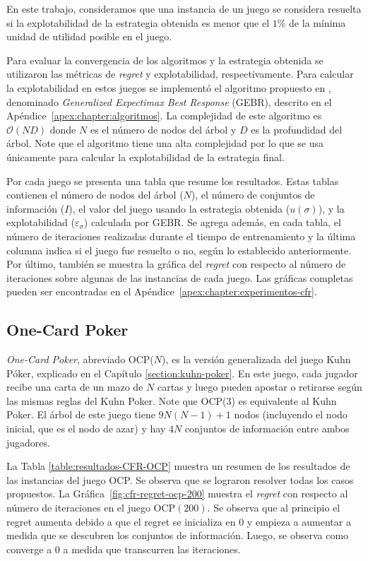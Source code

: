 En este trabajo, consideramos que una instancia de un juego se considera resuelta si la explotabilidad de la estrategia obtenida es menor que el $1\%$ de la mínima unidad de utilidad posible en el juego.

Para evaluar la convergencia de los algoritmos y la estrategia obtenida se utilizaron las métricas de \textit{regret} y explotabilidad, respectivamente. Para calcular la explotabilidad en estos juegos se implementó el algoritmo propuesto en \cite{bib:thesis-marc-lanctot}, denominado \textit{Generalized Expectimax Best Response} (GEBR), descrito en el Apéndice~\ref{apex:chapter:algoritmos}. La complejidad de este algoritmo es $\mathcal{O}(ND)$ donde $N$ es el número de nodos del árbol y $D$ es la profundidad del árbol. Note que el algoritmo tiene una alta complejidad por lo que se usa únicamente para calcular la explotabilidad de la estrategia final.

Por cada juego se presenta una tabla que resume los resultados. Estas tablas contienen el número de nodos del árbol ($N$), el número de conjuntos de información ($I$), el valor del juego usando la estrategia obtenida ($u({\sigma})$), y la explotabilidad ($\varepsilon_{\sigma}$) calculada por GEBR. Se agrega además, en cada tabla, el número de iteraciones realizadas durante el tiempo de entrenamiento y la última columna indica si el juego fue resuelto o no, según lo establecido anteriormente. Por último, también se muestra la gráfica del \textit{regret} con respecto al número de iteraciones sobre algunas de las instancias de cada juego. Las gráficas completas pueden ser encontradas en el Apéndice~\ref{apex:chapter:experimentos-cfr}.

\subsection*{One-Card Poker}
\textit{One-Card Poker}, abreviado OCP($N$), es la versión generalizada del juego Kuhn Póker, explicado en el Capítulo \ref{section:kuhn-poker}. En este juego, cada jugador recibe una carta de un mazo de $N$ cartas y luego pueden apostar o retirarse según las mismas reglas del Kuhn Poker. Note que OCP(3) es equivalente al Kuhn Poker. El árbol de este juego tiene $9N(N-1)+1$ nodos (incluyendo el nodo inicial, que es el nodo de azar) y hay $4N$ conjuntos de información entre ambos jugadores. 

La Tabla \ref{table:resultados-CFR-OCP} muestra un resumen de los resultados de las instancias del juego OCP. Se observa que se lograron resolver todas los casos propuestos. La Gráfica~\ref{fig:cfr-regret-ocp-200} muestra el \textit{regret} con respecto al número de iteraciones en el juego OCP$(200)$. Se observa que al principio el regret aumenta debido a que el regret se inicializa en $0$ y empieza a aumentar a medida que se descubren los conjuntos de información. Luego, se observa como converge a $0$ a medida que transcurren las iteraciones.

